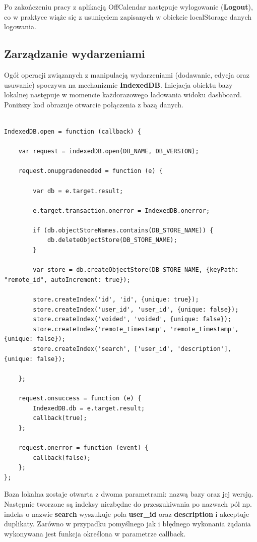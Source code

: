 Po zakończeniu pracy z aplikacją OffCalendar następuje wylogowanie (\textbf{Logout}), co w praktyce wiąże się z usunięciem zapisanych w obiekcie localStorage danych logowania.

\subsection{Zarządzanie wydarzeniami}
\label{sec:zarzWyd}

Ogół operacji związanych z manipulacją wydarzeniami (dodawanie, edycja oraz usuwanie) spoczywa na mechanizmie \textbf{IndexedDB}. Inicjacja obiektu bazy lokalnej następuje w momencie każdorazowego ładowania widoku dashboard. Poniższy kod obrazuje otwarcie połączenia z bazą danych.

\begin{lstlisting}[caption=Otwarcie połączenia z lokalną bazą danych., label=amb, captionpos=b]

IndexedDB.open = function (callback) {

    var request = indexedDB.open(DB_NAME, DB_VERSION);

    request.onupgradeneeded = function (e) {

        var db = e.target.result;

        e.target.transaction.onerror = IndexedDB.onerror;

        if (db.objectStoreNames.contains(DB_STORE_NAME)) {
            db.deleteObjectStore(DB_STORE_NAME);
        }

        var store = db.createObjectStore(DB_STORE_NAME, {keyPath: "remote_id", autoIncrement: true});

        store.createIndex('id', 'id', {unique: true});
        store.createIndex('user_id', 'user_id', {unique: false});
        store.createIndex('voided', 'voided', {unique: false});
        store.createIndex('remote_timestamp', 'remote_timestamp', {unique: false});
        store.createIndex('search', ['user_id', 'description'], {unique: false});

    };

    request.onsuccess = function (e) {
        IndexedDB.db = e.target.result;
        callback(true);
    };

    request.onerror = function (event) {
        callback(false);
    };
};

\end{lstlisting}

Baza lokalna zostaje otwarta z dwoma parametrami: nazwą bazy oraz jej wersją. Następnie tworzone są indeksy niezbędne do przeszukiwania po nazwach pól np. indeks o nazwie \textbf{search} wyszukuje pola \textbf{user\_id} oraz \textbf{description} i akceptuje duplikaty. Zarówno w przypadku pomyślnego jak i błędnego wykonania żądania wykonywana jest funkcja określona w parametrze callback. 

